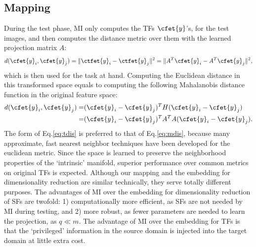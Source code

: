 
\subsection{Mapping}
During the test phase, MI only computes the TFs $\cfet{y}$'s, for the
test images, and then computes the distance metric over them with the 
learned projection matrix $A$:
\begin{equation}
  \label{eq:tdis}
  d(\cfet{y}_i, \cfet{y}_j) = \|\ctfet{y}_i - \ctfet{y}_j\|^2 = \|A^T\cfet{y}_i - A^T\cfet{y}_j\|^2, 
\end{equation}
which is then used for the task at hand. Computing the Euclidean
distance in this transformed space equals to computing the following
Mahalanobis distance function in the original feature space: 
%
 \begin{align}
\label{eq:mdis}
  d(\cfet{y}_i, \cfet{y}_j) = &(\cfet{y}_i - \cfet{y}_j )^T H (\cfet{y}_i - \cfet{y}_j)  \nonumber \\
                           = & (\cfet{y}_i - \cfet{y}_j )^T A^TA (\cfet{y}_i - \cfet{y}_j).  
 \end{align}
%
 The form of Eq.\ref{eq:tdis} is preferred to that of
 Eq.\ref{eq:mdis}, because many approximate, fast nearest neighbor
 techniques have been developed for the euclidean metric. Since the
 space is learned to preserve the neighborhood properties of the
 `intrinsic' manifold, superior performance over common metrics on
 original TFs is expected.  Although our mapping and the embedding for
 dimensionality reduction are similar technically, they serve totally
 different purposes. The advantages of MI over the embedding for
 dimensionality reduction of SFs are twofold: 1) computationally more
 efficient, as SFs are not needed by MI during testing, and 2) more
 robust, as fewer parameters are needed to learn the projection, as $q
 \ll m$. The advantage of MI over the embedding for TFs is that the
 `privileged' information in the source domain is injected into the target
 domain at little extra cost.





